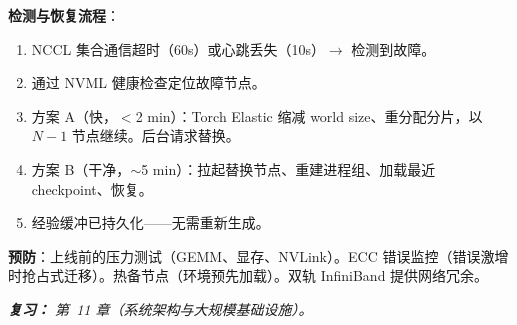 \begin{questionbox}
\textbf{检测与恢复流程}：

\begin{enumerate}
  \item NCCL 集合通信超时（60s）或心跳丢失（10s）$\rightarrow$ 检测到故障。
  \item 通过 NVML 健康检查定位故障节点。
  \item 方案 A（快，$<$2 min）：Torch Elastic 缩减 world size、重分配分片，以 $N-1$ 节点继续。后台请求替换。
  \item 方案 B（干净，$\sim$5 min）：拉起替换节点、重建进程组、加载最近 checkpoint、恢复。
  \item 经验缓冲已持久化——无需重新生成。
\end{enumerate}

\textbf{预防}：上线前的压力测试（GEMM、显存、NVLink）。ECC 错误监控（错误激增时抢占式迁移）。热备节点（环境预先加载）。双轨 InfiniBand 提供网络冗余。

\emph{\textbf{复习：} 第~11 章（系统架构与大规模基础设施）。}
\end{questionbox}

